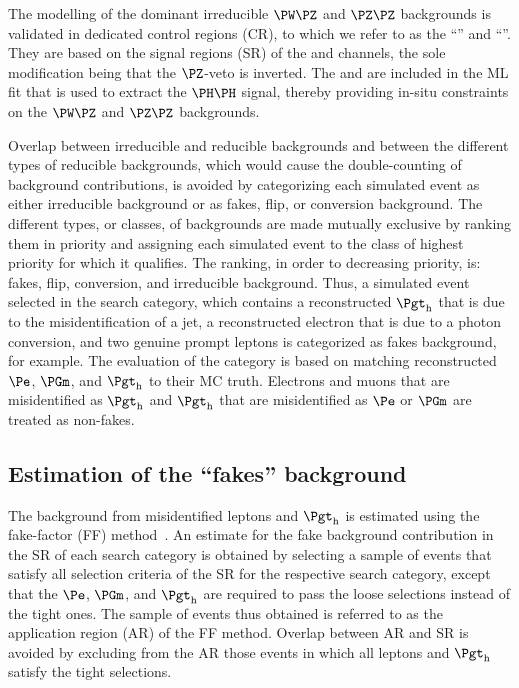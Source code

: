The modelling of the dominant irreducible $\PW\PZ$ and $\PZ\PZ$ backgrounds is validated in dedicated control regions (CR),
to which we refer to as the ``\threeLeptonCR'' and ``\fourLeptonCR''.
They are based on the signal regions (SR) of the \threeLeptonZeroTau and \fourLeptonZeroTau channels,
the sole modification being that the $\PZ$-veto is inverted.
The \threeLeptonCR and \fourLeptonCR are included in the ML fit that is used to extract the $\PHiggs\PHiggs$ signal,
thereby providing in-situ constraints on the $\PW\PZ$ and $\PZ\PZ$ backgrounds.

Overlap between irreducible and reducible backgrounds and between the different types of reducible backgrounds,
which would cause the double-counting of background contributions,
is avoided by categorizing each simulated event as either irreducible background or as fakes, flip, or conversion background.
The different types, or classes, of backgrounds are made mutually exclusive by ranking them in priority and assigning each simulated event to the class of highest priority for which it qualifies.
The ranking, in order to decreasing priority, is: fakes, flip, conversion, and irreducible background.
Thus, a simulated event selected in the \threeLeptonOneTau search category, which contains a reconstructed $\tauh$ that is due to the misidentification of a jet,
a reconstructed electron that is due to a photon conversion, and two genuine prompt leptons is categorized as fakes background, for example.
The evaluation of the category is based on matching reconstructed $\Pe$, $\PGm$, and $\tauh$ to their MC truth.
Electrons and muons that are misidentified as $\tauh$ and $\tauh$ that are misidentified as $\Pe$ or $\PGm$ are treated as non-fakes.


\subsection{Estimation of the ``fakes'' background}
\label{sec:backgroundEstimation_fakes}

The background from misidentified leptons and $\tauh$ is estimated using the fake-factor (FF) method~\cite{Sirunyan:2018shy}.
An estimate for the fake background contribution in the SR of each search category is obtained
by selecting a sample of events that satisfy all selection criteria of the SR for the respective search category,
except that the $\Pe$, $\PGm$, and $\tauh$ are required to pass the loose selections instead of the tight ones.
The sample of events thus obtained is referred to as the application region (AR) of the FF method.
Overlap between AR and SR is avoided by excluding from the AR those events in which all leptons and $\tauh$ satisfy the tight selections.

